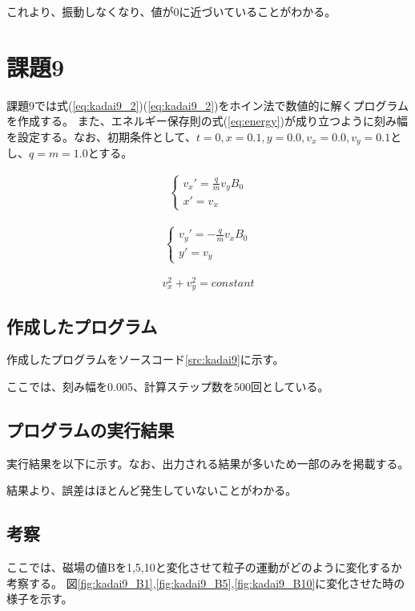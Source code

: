 \documentclass[11pt,titlepage]{jsarticle}
\begin{document}
これより、振動しなくなり、値が0に近づいていることがわかる。


\section{課題9}
課題9では式(\ref{eq:kadai9_2})(\ref{eq:kadai9_2})をホイン法で数値的に解くプログラムを作成する。
また、エネルギー保存則の式(\ref{eq:energy})が成り立つように刻み幅を設定する。なお、初期条件として、$t=0,x=0.1,y=0.0,v_x=0.0,v_y=0.1$とし、$q=m=1.0$とする。

\begin{eqnarray}
\label{eq:kadai9_2}
	\left\{
		\begin{array}{l}
			v_x'=\frac{q}{m}v_yB_0\\
			x'=v_x
		\end{array}
	\right.
\end{eqnarray}

\begin{eqnarray}
\label{eq:kadai9_3}
	\left\{
		\begin{array}{l}
			v_y'=-\frac{q}{m}v_xB_0\\
			y'=v_y
		\end{array}
	\right.
\end{eqnarray}

\begin{equation}
\label{eq:energy}
	v^2_x+v^2_y=constant
\end{equation}

\subsection{作成したプログラム}
作成したプログラムをソースコード\ref{src:kadai9}に示す。



ここでは、刻み幅を0.005、計算ステップ数を500回としている。

\subsection{プログラムの実行結果}
実行結果を以下に示す。なお、出力される結果が多いため一部のみを掲載する。
\begin{oframed}
\end{oframed}
結果より、誤差はほとんど発生していないことがわかる。

\subsection{考察}
ここでは、磁場の値Bを1,5,10と変化させて粒子の運動がどのように変化するか考察する。
図\ref{fig:kadai9_B1},\ref{fig:kadai9_B5},\ref{fig:kadai9_B10}に変化させた時の様子を示す。
\end{document}
